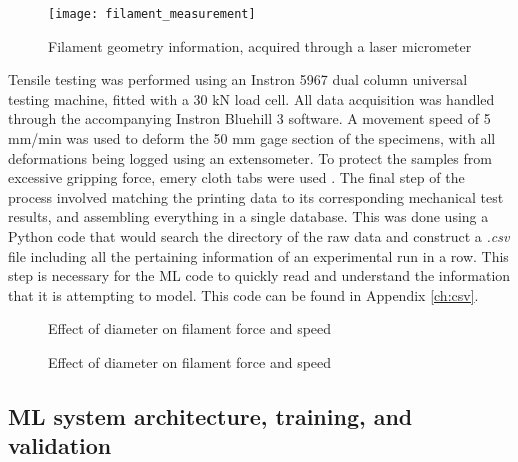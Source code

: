 \documentclass[main.tex]{subfiles}
\begin{document}
\begin{figure}[!htbp]
	\center
	\texttt{[image: filament\_measurement]}
	\caption{Filament geometry information, acquired through a laser micrometer } \label{fig:FD}
\end{figure}

Tensile testing was performed using an Instron 5967 dual column universal testing machine, fitted with a 30 kN load cell. All data acquisition was handled through the accompanying Instron Bluehill 3 software. A movement speed of 5 mm/min was used to deform the 50 mm gage section of the specimens, with all deformations being logged using an extensometer. To protect the samples from excessive gripping force, emery cloth tabs were used \cite{Capote2017}. The final step of the process involved matching the printing data to its corresponding mechanical test results, and assembling everything in a single database. This was done using a Python code that would search the directory of the raw data and construct a \emph{.csv} file including all the pertaining information of an experimental run in a row. This step is necessary for the ML code to quickly read and understand the information that it is attempting to model. This code can be found in Appendix \ref{ch:csv}. 

\begin{figure}[h]
	\center
	\linebreak
	\caption{Effect of diameter on filament force and speed} \label{fig:dia_f_sp}
\end{figure}

\begin{figure}[h]
	\center
	\linebreak
	\caption{Effect of diameter on filament force and speed} \label{fig:ov_f_sp}
\end{figure}

\subsection{ML system architecture, training, and validation}\label{ssec:MLA}
\end{document}
